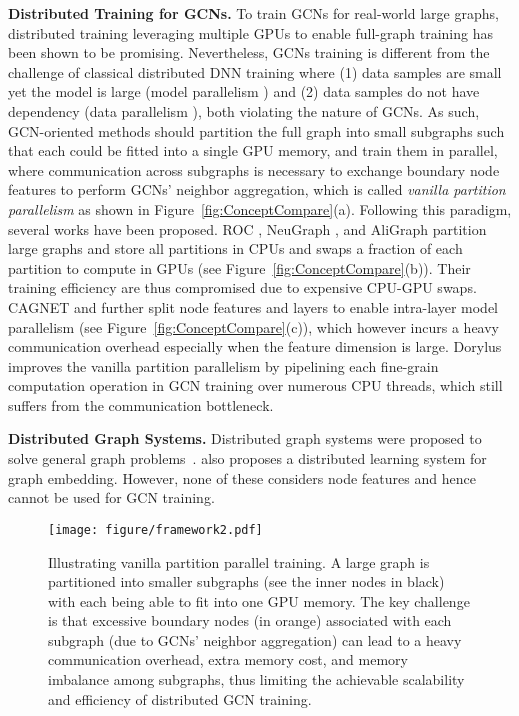 \documentclass{article}
\newcommand{\niparagraph}[1]{\noindent\textbf{#1}}
\begin{document}
\niparagraph{Distributed Training for GCNs.}
To train GCNs for real-world large graphs, distributed training leveraging multiple GPUs to enable full-graph training has been shown to be promising.  
Nevertheless, GCNs training is different from the challenge of classical distributed DNN training where (1) data samples are small yet the model is large (model parallelism \citep{krizhevsky2014one,harlap2018pipedream}) and (2) data samples do not have dependency (data parallelism \citep{li2020pytorch,li2018pipe,li2018inceptionn}), both violating the nature of GCNs. As such,
GCN-oriented methods should partition the full graph into small subgraphs such that each could be fitted into a single GPU memory, and train them in parallel, where communication across subgraphs is necessary to exchange boundary node features to perform GCNs' neighbor aggregation, which is called \textit{vanilla partition parallelism} as shown in Figure~\ref{fig:ConceptCompare}(a).
Following this paradigm, several works have been proposed.
ROC \citep{jia2020improving}, NeuGraph \citep{ma2019neugraph}, and AliGraph \citep{zhu2019aligraph} partition large graphs and store all partitions in CPUs and swaps a fraction of each partition to compute in GPUs (see Figure~\ref{fig:ConceptCompare}(b)). 
Their training efficiency are thus compromised due to expensive CPU-GPU swaps.
CAGNET \citep{tripathy2020reducing} and  \citep{gandhi2021p3} further split node features and layers to enable intra-layer model parallelism (see Figure~\ref{fig:ConceptCompare}(c)), which however incurs a heavy communication overhead especially when the feature dimension is large.
Dorylus \citep{thorpe2021dorylus} improves the vanilla partition parallelism by pipelining each fine-grain computation operation in GCN training over numerous CPU threads, which still suffers from the communication bottleneck.

\niparagraph{Distributed Graph Systems.}
Distributed graph systems were proposed to solve general graph problems~\citep{gonzalez2012powergraph,shun2013ligra,nguyen2013lightweight,zhu2016gemini,chen2019powerlyra}. 
\citep{lerer2019pytorch} also proposes a distributed learning system for graph embedding. 
However, none of these considers node features and hence cannot be used for GCN training.


 \begin{figure*}[t]
\begin{center}
\texttt{[image: figure/framework2.pdf]}
\end{center}
\caption{Illustrating vanilla partition parallel training. A large graph is partitioned into smaller subgraphs (see the inner nodes in black) with each being able to fit into one GPU memory. The key challenge is that excessive boundary nodes (in orange) associated with each subgraph (due to GCNs' neighbor aggregation) can lead to a heavy communication overhead, extra memory cost, and memory imbalance among subgraphs, thus limiting the achievable scalability and efficiency of distributed GCN training.}
\label{fig:framework}
\end{figure*}
\end{document}

